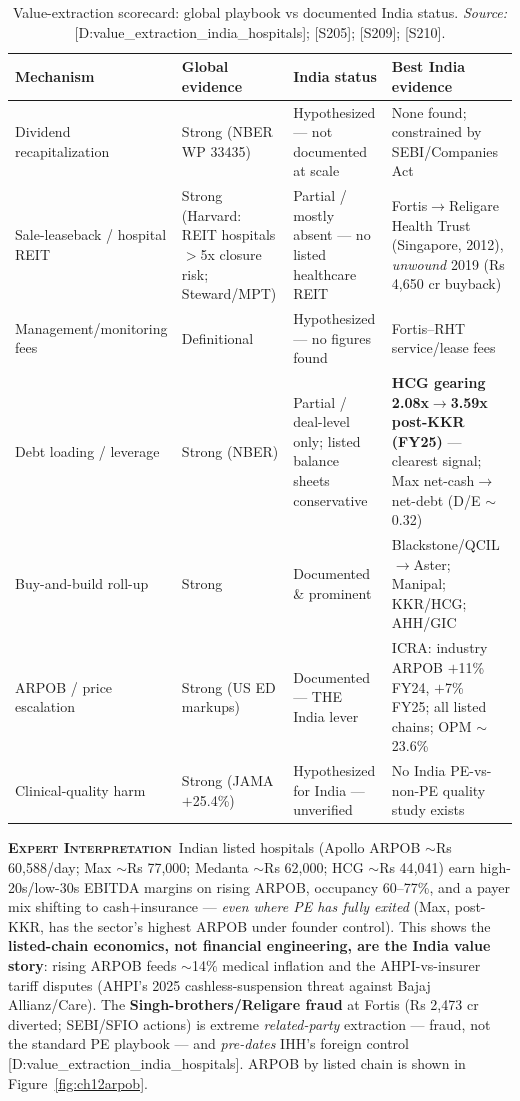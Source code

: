 \documentclass[11pt,a4paper]{article}
\newcommand{\EI}{\textcolor{eicol}{\textsc{\textbf{Expert Interpretation}}}}
\newcommand{\cs}[1]{\textnormal{[#1]}}
\begin{document}
\begin{table}[htbp]
\centering
\small
\setlength{\tabcolsep}{4pt}
\caption{Value-extraction scorecard: global playbook vs documented India status. \textit{Source:} \cs{D:value\_extraction\_india\_hospitals}; \cs{S205}; \cs{S209}; \cs{S210}.}
\label{tab:valuescorecard}
\begin{tabularx}{\textwidth}{@{}>{\raggedright\arraybackslash}p{3.2cm} >{\raggedright\arraybackslash}p{3.3cm} >{\raggedright\arraybackslash}p{3.4cm} >{\raggedright\arraybackslash}X@{}}
\toprule
\textbf{Mechanism} & \textbf{Global evidence} & \textbf{India status} & \textbf{Best India evidence} \\
\midrule
Dividend recapitalization & Strong (NBER WP 33435) & Hypothesized --- not documented at scale & None found; constrained by SEBI/Companies Act \\
Sale-leaseback / hospital REIT & Strong (Harvard: REIT hospitals $>$5x closure risk; Steward/MPT) & Partial / mostly absent --- no listed healthcare REIT & Fortis$\rightarrow$Religare Health Trust (Singapore, 2012), \emph{unwound} 2019 (Rs 4{,}650 cr buyback) \\
Management/monitoring fees & Definitional & Hypothesized --- no figures found & Fortis--RHT service/lease fees \\
Debt loading / leverage & Strong (NBER) & Partial / deal-level only; listed balance sheets conservative & \textbf{HCG gearing 2.08x$\rightarrow$3.59x post-KKR (FY25)} --- clearest signal; Max net-cash$\rightarrow$net-debt (D/E $\sim$0.32) \\
Buy-and-build roll-up & Strong & Documented \& prominent & Blackstone/QCIL$\rightarrow$Aster; Manipal; KKR/HCG; AHH/GIC \\
ARPOB / price escalation & Strong (US ED markups) & Documented --- THE India lever & ICRA: industry ARPOB $+$11\% FY24, $+$7\% FY25; all listed chains; OPM $\sim$23.6\% \\
Clinical-quality harm & Strong (JAMA $+$25.4\%) & Hypothesized for India --- unverified & No India PE-vs-non-PE quality study exists \\
\bottomrule
\end{tabularx}
\end{table}

\EI\ Indian listed hospitals (Apollo ARPOB $\sim$Rs 60{,}588/day; Max $\sim$Rs 77{,}000; Medanta $\sim$Rs 62{,}000; HCG $\sim$Rs 44{,}041) earn high-20s/low-30s EBITDA margins on rising ARPOB, occupancy 60--77\%, and a payer mix shifting to cash$+$insurance --- \emph{even where PE has fully exited} (Max, post-KKR, has the sector's highest ARPOB under founder control). This shows the \textbf{listed-chain economics, not financial engineering, are the India value story}: rising ARPOB feeds $\sim$14\% medical inflation and the AHPI-vs-insurer tariff disputes (AHPI's 2025 cashless-suspension threat against Bajaj Allianz/Care). The \textbf{Singh-brothers/Religare fraud} at Fortis (Rs 2{,}473 cr diverted; SEBI/SFIO actions) is extreme \emph{related-party} extraction --- fraud, not the standard PE playbook --- and \emph{pre-dates} IHH's foreign control \cs{D:value\_extraction\_india\_hospitals}. ARPOB by listed chain is shown in Figure~\ref{fig:ch12arpob}.
\end{document}
